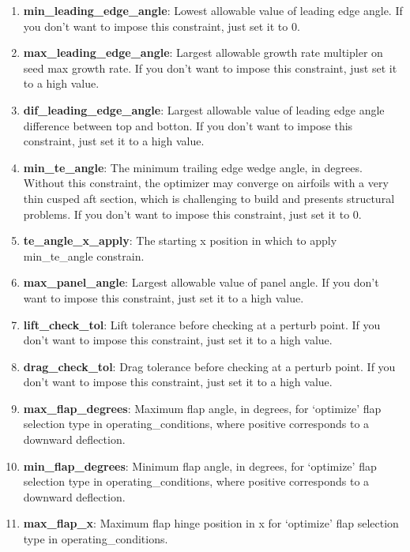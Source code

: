 \documentclass[11pt]{article}
\begin{document}
\begin{enumerate}
\item{\textbf{min\_leading\_edge\_angle}: Lowest allowable value of leading edge angle. 
	If you don't want to impose this constraint, just set it to 0.}
\item{\textbf{max\_leading\_edge\_angle}: Largest allowable growth rate multipler on seed max growth rate. 
	If you don't want to impose this constraint, just set it to a high value.}
\item{\textbf{dif\_leading\_edge\_angle}: Largest allowable value of leading edge angle 
	difference between top and botton. 
	If you don't want to impose this constraint, just set it to a high value.}

\item{\textbf{min\_te\_angle}: The minimum trailing edge wedge angle, in degrees.  Without
	this constraint, the optimizer may converge on airfoils with a very thin cusped aft
	section, which is challenging to build and presents structural problems.  If you don't
	want to impose this constraint, just set it to 0.}
\item{\textbf{te\_angle\_x\_apply}: The starting x position in which to apply min\_te\_angle constrain.}

\item{\textbf{max\_panel\_angle}: Largest allowable value of panel angle. 
	If you don't want to impose this constraint, just set it to a high value.}

\item{\textbf{lift\_check\_tol}: Lift tolerance before checking at a perturb point. 
	If you don't want to impose this constraint, just set it to a high value.}
\item{\textbf{drag\_check\_tol}: Drag tolerance before checking at a perturb point. 
	If you don't want to impose this constraint, just set it to a high value.}

\item{\textbf{max\_flap\_degrees}: Maximum flap angle, in degrees, for `optimize' flap 
	selection type in operating\_conditions, where positive corresponds to a downward
	deflection.}

\item{\textbf{min\_flap\_degrees}: Minimum flap angle, in degrees, for `optimize' flap 
selection type in operating\_conditions, where positive corresponds to a downward
deflection.}

\item{\textbf{max\_flap\_x}: Maximum flap hinge position in x for `optimize' flap 
	selection type in operating\_conditions.}


\end{enumerate}
\end{document}
